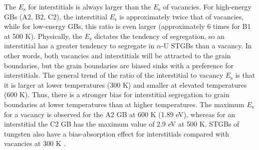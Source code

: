 \documentclass[review]{elsarticle}
\begin{document}
\par The $E_{\mathrm{s}}$ for interstitials is always larger than the $E_{\mathrm{s}}$ of vacancies. For high-energy GBs (A2, B2, C2), the interstitial $E_{\mathrm{s}}$ is approximately twice that of vacancies, while for low-energy GBs, this ratio is even larger (approximately 6 times for B1 at 500 K). Physically, the $E_{\mathrm{s}}$ dictates the tendency of segregation, so an interstitial has a greater tendency to segregate in $\alpha$-U STGBs than a vacancy. In other words, both vacancies and interstitials will be attracted to the grain boundaries, but the grain boundaries are biased sinks with a preference for interstitials.  The general trend of the ratio of the interstitial to vacancy $E_{\mathrm{s}}$ is that it is larger at lower temperatures (300 K) and smaller at elevated temperatures (600 K). Thus, there is a stronger bias for interstitial segregation to grain boundaries at lower temperatures than at higher temperatures. The maximum $E_{\mathrm{s}}$ for a vacancy is observed for the A2 GB at 600 K (1.89 eV), whereas for an interstitial the C2 GB has the maximum value of 2.9 eV at 500 K. STGBs of tungsten also have a bias-absorption effect for interstitials compared with vacancies at 300 K \cite{Tungsten}. 

\end{document}

